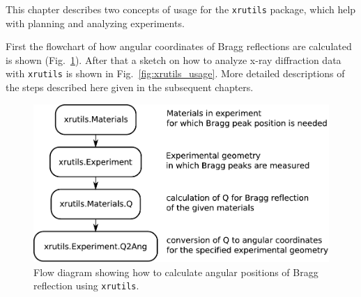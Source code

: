 %
%
%
%


This chapter describes two concepts of usage for the {\tt xrutils} package, which help with planning and analyzing experiments.

First the flowchart of how angular coordinates of Bragg reflections are calculated is shown (Fig.~\ref{fig:xrutils_usage_planning}). After that a sketch on how to analyze x-ray diffraction data with {\tt xrutils} is shown in Fig.~\ref{fig:xrutils_usage}. More detailed descriptions of the steps described here given in the subsequent chapters.

\begin{figure}[H]
 \centering
 \includegraphics[width=0.8\linewidth]{pics/xrutils_usage_planning}
 \caption{Flow diagram showing how to calculate angular positions of Bragg reflection using {\tt xrutils}.}
 \label{fig:xrutils_usage_planning}
\end{figure}

